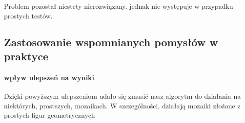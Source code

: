 \documentclass[a4paper,12pt,leqno]{article}
\begin{document}
Problem pozostał niestety nierozwiązany, jednak nie występuje w przypadku prostych testów.

\subsection{Zastosowanie wspomnianych pomysłów w praktyce}
\paragraph{wpływ ulepszeń na wyniki}
Dzięki powyższym ulepszeniom udało się zmusić nasz algorytm do działania na niektórych, prostszych, mozaikach. W szczególności, działają mozaiki złożone z prostych figur geometrycznych
\end{document}
